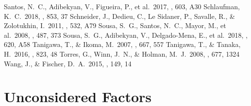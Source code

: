 \documentclass[twocolumn, dvipdfmx]{aastex62}
\begin{document}
\begin{CJK*}{UTF8}{min}
\begin{thebibliography}{}
 Santos, N.~C., Adibekyan, V., Figueira, P., et al.\ 2017, \aap, 603, A30
 Schlaufman, K.~C.\ 2018, \apj, 853, 37
 Schneider, J., Dedieu, C., Le Sidaner, P., Savalle, R., \& Zolotukhin, I.\ 2011, \aap, 532, A79
 Sousa, S.~G., Santos, N.~C., Mayor, M., et al.\ 2008, \aap, 487, 373
 Sousa, S.~G., Adibekyan, V., Delgado-Mena, E., et al.\ 2018, \aap, 620, A58
 Tanigawa, T., \& Ikoma, M.\ 2007, \apj, 667, 557
 Tanigawa, T., \& Tanaka, H.\ 2016, \apj, 823, 48
 Torres, G., Winn, J.~N., \& Holman, M.~J.\ 2008, \apj, 677, 1324
 Wang, J., \& Fischer, D.~A.\ 2015, \aj, 149, 14

\end{thebibliography}

\appendix

\section{Unconsidered Factors}

\end{CJK*}
\end{document}
